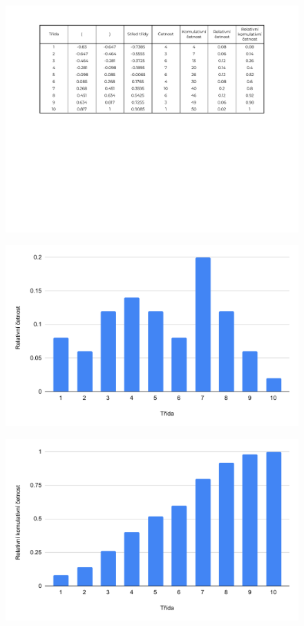 \begin{figure}[H]
    \centering
    \includegraphics[width=1\linewidth]{1-a-1-crop.pdf}
\end{figure}

\begin{figure}[H]
    \centering
    \includegraphics[width=.75\linewidth]{1-a-2.pdf}
\end{figure}

\begin{figure}[H]
    \centering
    \includegraphics[width=.75\linewidth]{1-a-3.pdf}
\end{figure}

